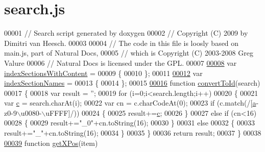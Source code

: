 \hypertarget{search_8js_source}{\section{search.\+js}
\label{search_8js_source}
}

\begin{DoxyCode}
00001 \textcolor{comment}{// Search script generated by doxygen}
00002 \textcolor{comment}{// Copyright (C) 2009 by Dimitri van Heesch.}
00003 
00004 \textcolor{comment}{// The code in this file is loosly based on main.js, part of Natural Docs,}
00005 \textcolor{comment}{// which is Copyright (C) 2003-2008 Greg Valure}
00006 \textcolor{comment}{// Natural Docs is licensed under the GPL.}
00007 
\hypertarget{search_8js_source_l00008}{}\hyperlink{search_8js_a6250af3c9b54dee6efc5f55f40c78126}{00008} var \hyperlink{search_8js_a6250af3c9b54dee6efc5f55f40c78126}{indexSectionsWithContent} =
00009 \{
00010 \};
00011 
\hypertarget{search_8js_source_l00012}{}\hyperlink{search_8js_a77149ceed055c6c6ce40973b5bdc19ad}{00012} var \hyperlink{search_8js_a77149ceed055c6c6ce40973b5bdc19ad}{indexSectionNames} =
00013 \{
00014 \};
00015 
\hypertarget{search_8js_source_l00016}{}\hyperlink{search_8js_a196a29bd5a5ee7cd5b485e0753a49e57}{00016} \textcolor{keyword}{function} \hyperlink{search_8js_a196a29bd5a5ee7cd5b485e0753a49e57}{convertToId}(search)
00017 \{
00018   var result = \textcolor{stringliteral}{''};
00019   \textcolor{keywordflow}{for} (i=0;i<search.length;i++)
00020   \{
00021     var \hyperlink{jquery_8js_abce695e0af988ece0826d9ad59b8160d}{c} = search.charAt(i);
00022     var cn = c.charCodeAt(0);
00023     \textcolor{keywordflow}{if} (c.match(/[\hyperlink{jquery_8js_aa4d4888597588a84fd5b1184d00c91f3}{a}-z0-9\(\backslash\)u0080-\(\backslash\)uFFFF]/))
00024     \{
00025       result+=\hyperlink{jquery_8js_abce695e0af988ece0826d9ad59b8160d}{c};
00026     \}
00027     \textcolor{keywordflow}{else} \textcolor{keywordflow}{if} (cn<16) 
00028     \{
00029       result+=\textcolor{stringliteral}{"\_0"}+cn.toString(16);
00030     \}
00031     \textcolor{keywordflow}{else} 
00032     \{
00033       result+=\textcolor{stringliteral}{"\_"}+cn.toString(16);
00034     \}
00035   \}
00036   \textcolor{keywordflow}{return} result;
00037 \}
00038 
\hypertarget{search_8js_source_l00039}{}\hyperlink{search_8js_a76d24aea0009f892f8ccc31d941c0a2b}{00039} \textcolor{keyword}{function} \hyperlink{search_8js_a76d24aea0009f892f8ccc31d941c0a2b}{getXPos}(item)

\end{DoxyCode}
